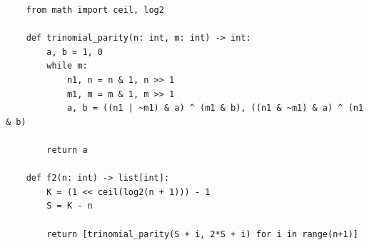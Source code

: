 \documentclass{article}
\begin{document}
	\begin{center}
	\begin{verbatim}
	from math import ceil, log2
	
	def trinomial_parity(n: int, m: int) -> int:
	    a, b = 1, 0
	    while m:
        	n1, n = n & 1, n >> 1
        	m1, m = m & 1, m >> 1
        	a, b = ((n1 | ~m1) & a) ^ (m1 & b), ((n1 & ~m1) & a) ^ (n1 & b)
	    
	    return a
	    
	def f2(n: int) -> list[int]:
	    K = (1 << ceil(log2(n + 1))) - 1
	    S = K - n
	    
	    return [trinomial_parity(S + i, 2*S + i) for i in range(n+1)]
	\end{verbatim}
	\end{center}
\end{document}
